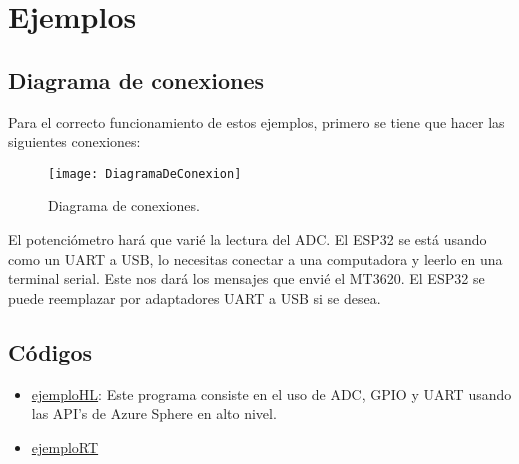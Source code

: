 \section{Ejemplos}
\subsection{Diagrama de conexiones}
Para el correcto funcionamiento de estos ejemplos, primero se tiene que hacer las siguientes conexiones:
\begin{figure}[h]
	\centering
	\texttt{[image: DiagramaDeConexion]}
	\caption{Diagrama de conexiones.}
\end{figure}
\linebreak
El potenciómetro hará que varié la lectura del ADC. El ESP32 se está usando como un UART a USB, lo necesitas conectar a una computadora y leerlo en una terminal serial. Este nos dará los mensajes que envié el MT3620. El ESP32 se puede reemplazar por adaptadores UART a USB si se desea.
\pagebreak
\subsection{Códigos}
\begin{itemize}
	\item 
	\href{https://github.com/Javier20060904/ejemplo_HL}{ejemplo\textunderscore HL}: Este programa consiste en el uso de ADC, GPIO y UART usando las API's de Azure Sphere en alto nivel.
	\item
	\href{URL}{ejemplo\textunderscore RT}
\end{itemize}


